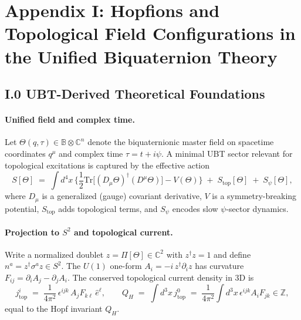 
\appendix
\section{Appendix I: Hopfions and Topological Field Configurations in the Unified Biquaternion Theory}


\subsection*{I.0 UBT-Derived Theoretical Foundations}
\paragraph{Unified field and complex time.}
Let $\Theta(q,\tau)\in\mathbb{B}\otimes\mathbb{C}^n$ denote the biquaternionic master field on spacetime coordinates $q^\mu$ and complex time $\tau=t+i\psi$.
A minimal UBT sector relevant for topological excitations is captured by the effective action
\begin{equation}
S[\Theta] \;=\; \int d^4x \, \Big\{
\frac{1}{2}\mathrm{Tr}\big[(D_\mu \Theta)^\dagger (D^\mu \Theta)\big]
- V(\Theta) \Big\}
\;+\; S_{\text{top}}[\Theta]\;+\;S_{\psi}[\Theta],
\end{equation}
where $D_\mu$ is a generalized (gauge) covariant derivative, $V$ is a symmetry-breaking potential, $S_{\text{top}}$ adds topological terms, and $S_{\psi}$ encodes slow $\psi$-sector dynamics.

\paragraph{Projection to $S^2$ and topological current.}
Write a normalized doublet $z=\Pi[\Theta]\in \mathbb{C}^2$ with $z^\dagger z=1$ and define $n^a=z^\dagger\sigma^a z\in S^2$.
The $U(1)$ one-form $A_i=-i\,z^\dagger\partial_i z$ has curvature $F_{ij}=\partial_iA_j-\partial_jA_i$.
The conserved topological current density in $3$D is
\begin{equation}
j_{\text{top}}^i \;=\; \frac{1}{4\pi^2}\,\epsilon^{ijk}\, A_j F_{k\ell}\, \hat{e}^\ell,\qquad
Q_H \;=\; \int d^3x\, j^0_{\text{top}} \;=\; \frac{1}{4\pi^2}\int d^3x\, \epsilon^{ijk} A_i F_{jk}\in\mathbb{Z},
\end{equation}
equal to the Hopf invariant $Q_H$.

